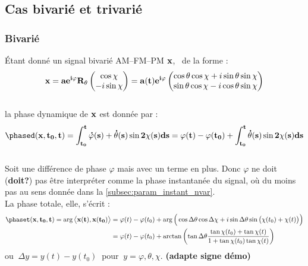 \subsection{Cas bivarié et trivarié}

\subsubsection{Bivarié}

\begin{proposition}\label{prop:phased/t_2var}
	\'Etant donné un signal bivarié AM--FM--PM $\bf{x}$, \ie~de la forme :
	\begin{equation}\label{eq:exp_elliptik_2var}
		\bf{x} = ae^{i\varphi} R_{\theta} \begin{pmatrix} \cos\chi \\ -i\sin\chi \end{pmatrix} 
			= a(t)e^{i\varphi} \begin{pmatrix} \cos\theta \cos\chi + i\sin\theta \sin\chi \\ \sin\theta \cos\chi - i\cos\theta \sin\chi \end{pmatrix}
	\end{equation}
	\\
	la phase dynamique de $\bf{x}$ est donnée par :
	\begin{equation}\label{eq:phased_2var}
		\phased(\bf{x}, t_0,t) = \int_{t_0}^t \dot{\varphi}(s) + \dot{\theta}(s) \sin2\chi(s) ds = \varphi(t) -\varphi(t_0) + \int_{t_0}^t\dot{\theta}(s) \sin2\chi(s) ds
	\end{equation}
	\\
	Soit une différence de phase $\varphi$ mais avec un terme en plus. Donc $\varphi$ ne doit (\textbf{doit?}) pas être interpréter comme la phase instantanée du signal, où du moins pas au sens donnée dans la \cref{subsec:param_instant_nvar}.
	\\
	La phase totale, elle, s'écrit :
	\begin{equation}\label{eq:phaset_2var}
		\begin{aligned}
			\phaset(\bf{x},t_0,t) = \arg\big\langle \bf{x}(t), \bf{x}(t_0)\big\rangle &= \varphi(t)-\varphi(t_0) + \arg\Big(\cos\Delta\theta \cos\Delta\chi + i\sin\Delta\theta \sin\big(\chi(t_0)+\chi(t)\big)\Big) \\
			&= \varphi(t)-\varphi(t_0) + \arctan\left(\tan\Delta\theta \frac{ \tan\chi(t_0)+\tan\chi(t)}{1 + \tan\chi(t_0)\tan\chi(t)}\right)
		\end{aligned}
	\end{equation}
	ou $\ \Delta y = y(t) - y(t_0)\ $ pour $\ y=\varphi,\theta,\chi$. \textbf{(adapte signe démo)}
\end{proposition}

